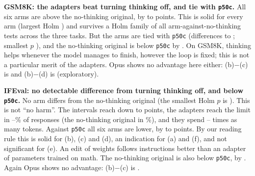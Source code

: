 \documentclass[11pt]{article}
\newcommand{\fitwidth}[1]{\resizebox{\ifdim\width>\linewidth\linewidth\else\width\fi}{!}{#1}}
\begin{document}
\textbf{GSM8K: the adapters beat turning thinking off, and tie with \texttt{p50c}.} All six arms are above the no-thinking original, by  to  points. This is solid for every arm (largest Holm ) and survives a Holm family of all  arm-against-no-thinking tests across the three tasks. But the arms are tied with \texttt{p50c} (differences  to ; smallest $p$ ), and the no-thinking original is below \texttt{p50c} by  . On GSM8K, thinking helps whenever the model manages to finish, however the loop is fixed; this is not a particular merit of the adapters. Opus shows no advantage here either: (b)$-$(c) is   and (b)$-$(d) is   (exploratory).

\textbf{IFEval: no detectable difference from turning thinking off, and below \texttt{p50c}.} No arm differs from the no-thinking original (the smallest Holm $p$ is ). This is not ``no harm''. The intervals reach down to  points, the adapters reach the limit in --\% of responses (the no-thinking original in \%), and they spend -- times as many tokens. Against \texttt{p50c} all six arms are lower, by  to  points. By our reading rule this is solid for (b), (c) and (d), an indication for (a) and (f), and not significant for (e). An edit of \MitEntries{} weights follows instructions better than an adapter of \ParamsLora{} parameters trained on math. The no-thinking original is also below \texttt{p50c}, by  . Again Opus shows no advantage: (b)$-$(c) is  .

\begin{table}[htbp]
\centering
\caption{GSM8K (\NGsm{} problems) and IFEval (\NIfeval{} prompts), $T=\TempMain$, per model. Same columns as Table~\ref{tab:models-math}. Source: \texttt{revision/rev\_por\_modelo.csv}.}\label{tab:models-transfer}
\footnotesize\setlength{\tabcolsep}{3pt}
\fitwidth{}
\end{table}
\end{document}
